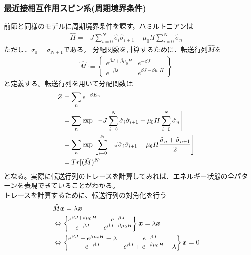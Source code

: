 \documentclass[dvipdfmx, 11pt, a4paper]{jsarticle}
\theoremstyle{definition}
\begin{document}
\subsubsection{最近接相互作用スピン系(周期境界条件)}
    前節と同様のモデルに周期境界条件を課す。ハミルトニアンは
    \begin{align}
        \hat{H} = -J\sum_{i = 0}^{N} \hat{\sigma}_i \hat{\sigma}_{i+1} - \mu_0 H \sum_{i=0}^{N}  \hat{\sigma}_n
    \end{align}
    ただし、$\sigma_0 = \sigma_{N+1}$である。
    分配関数を計算するために、転送行列$\hat{M}$を
    \begin{align}
        \hat{M} := \left\{  
        \begin{matrix}
            e^{\beta J + \beta \mu_0 H}& e^{-\beta J} \\
            e^{-\beta J}&e^{\beta J - \beta \mu_0 H}
        \end{matrix}
        \right\}
    \end{align}
    と定義する。転送行列を用いて分配関数は
    \begin{align}
        Z &= \sum_n e^{-\beta E_n} \notag \\
        &= \sum_n \exp \left[ -J\sum_{i = 0}^{N} \hat{\sigma}_i \hat{\sigma}_{i+1} - \mu_0 H \sum_{i=0}^{N}  \hat{\sigma}_n \right] \notag \\
        &= \sum_n \exp \left[ \sum_{i = 0}^{N} -J\hat{\sigma}_i \hat{\sigma}_{i+1} - \mu_0 H \frac{\hat{\sigma}_n + \hat{\sigma}_{n+1}}{2} \right] \notag \\
        &= Tr[ (\hat{M})^N] 
    \end{align}
    となる。実際に転送行列のトレースを計算してみれば、エネルギー状態の全パターンを表現できていることがわかる。\\
    トレースを計算するために、転送行列の対角化を行う
    \begin{align}
        &\hat{M}\bm{x} = \lambda \bm{x} \notag \\
        &\Leftrightarrow \left\{  
        \begin{matrix}
            e^{\beta J + \beta \mu_0 H}& e^{-\beta J} \\
            e^{-\beta J}&e^{\beta J - \beta \mu_0 H}
        \end{matrix}
        \right\}
        \bm{x} = \lambda \bm{x} \notag \\
        &\Leftrightarrow \left\{  
        \begin{matrix}
            e^{\beta J} + e^{\beta \mu_0 H} - \lambda & e^{-\beta J} \\
            e^{-\beta J}&e^{\beta J} + e^{- \beta \mu_0 H} - \lambda 
        \end{matrix}
        \right\} \bm{x} = 0
    \end{align}
\end{document}
